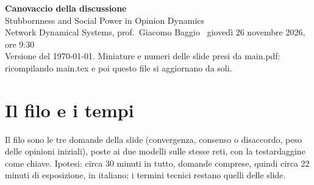 \newcommand{\resta}[1]{\textbf{Deve restare:} #1\par}
\newenvironment{dire}[1][]{\textbf{Cosa dire#1:}\begin{itemize}}{\end{itemize}}
\newcommand{\frase}[1]{\textbf{Frase:} \textit{«#1»}\par}
\newcommand{\passaggio}[1]{\textbf{Passaggio:} \textit{«#1»}\par}
\newcommand{\sechiede}[1]{\textbf{Se chiede} #1\par}
\newcommand{\nota}[1]{\textbf{Nota:} #1\par}
\newcommand{\attenzione}[1]{\textbf{Attenzione:} #1\par}
\newcommand{\parte}[2]{\section*{#1\hfill{\normalsize\itshape #2}}}



\begin{center}
  {\LARGE\bfseries Canovaccio della discussione}\\[3pt]
  {\large Stubbornness and Social Power in Opinion Dynamics}\\[2pt]
  Network Dynamical Systems, prof.\ Giacomo Baggio \textperiodcentered\ giovedì 26 novembre 2026, ore 9:30\\[2pt]
  {\small\color{gray} Versione del \today. Miniature e numeri delle slide presi da main.pdf: ricompilando main.tex e poi questo file si aggiornano da soli.}
\end{center}

\section*{Il filo e i tempi}

Il filo sono le tre domande della slide  (convergenza, consenso o disaccordo, peso delle opinioni iniziali), poste ai due modelli sulle stesse reti, con la testardaggine come chiave. Ipotesi: circa 30 minuti in tutto, domande comprese, quindi circa 22 minuti di esposizione, in italiano; i termini tecnici restano quelli delle slide.

